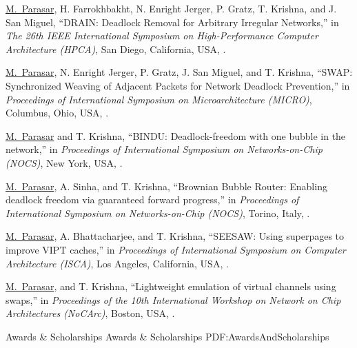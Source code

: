 \documentclass[letterpaper,MMMyyyy,nonstopmode]{simpleresumecv}
\begin{document}
\begin{Body}
\begingroup
\renewcommand{\MaxNumberedItem}{[8888]}

\BigGap
\NumberedItem{[1]}
{\underline{M.~Parasar}, H. Farrokhbakht, N. Enright Jerger, P. Gratz, T. Krishna, and J. San Miguel, 
``DRAIN: Deadlock Removal for Arbitrary Irregular Networks,''
in \textit{The 26th IEEE International Symposium on High-Performance Computer Architecture (HPCA)},
San Diego, California, USA,
.}

\NumberedItem{[2]}
{\underline{M.~Parasar}, N. Enright Jerger, P. Gratz, J. San Miguel, and T. Krishna,
``SWAP: Synchronized Weaving of Adjacent Packets for Network Deadlock Prevention,''
in \textit{Proceedings of International Symposium on Microarchitecture (MICRO)},
Columbus, Ohio, USA,
.}

\Gap
\NumberedItem{[3]}
{\underline{M.~Parasar} and T. Krishna,
``BINDU: Deadlock-freedom with one bubble in the network,''
in \textit{Proceedings of International Symposium on Networks-on-Chip (NOCS)},
New York, USA,
.}

\Gap
\NumberedItem{[4]}
{\underline{M.~Parasar}, A. Sinha, and T. Krishna,
``Brownian Bubble Router: Enabling deadlock freedom via guaranteed forward progress,''
in \textit{Proceedings of International Symposium on Networks-on-Chip (NOCS)},
Torino, Italy,
.}

\Gap
\NumberedItem{[5]}
{\underline{M.~Parasar}, A. Bhattacharjee, and T. Krishna,
``SEESAW: Using superpages to improve VIPT caches,''
in \textit{Proceedings of International Symposium on Computer Architecture (ISCA)},
Los Angeles, California, USA,
.}

\Gap
\NumberedItem{[6]}
{\underline{M.~Parasar},  and T. Krishna,
``Lightweight emulation of virtual channels using swaps,''
in \textit{Proceedings of the 10th International Workshop on Network on Chip Architectures (NoCArc)},
Boston, USA,
.}

\endgroup


\Section
{Awards \&\newline
Scholarships}
{Awards \& Scholarships}
{PDF:AwardsAndScholarships}


\end{Body}
\end{document}
